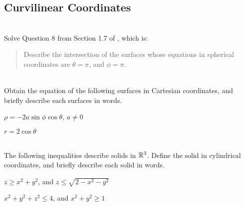 \subsection{Curvilinear Coordinates}
\BEN
\item 
{}\\
Solve Question 8 from Section 1.7 of \VCT, which is: 
\begin{quotation}
\noindent
Describe the intersection of the surfaces whose equations in spherical coordinates are $\theta = \pi$, and $\phi=\pi$.
\end{quotation}
\item 
{}\\
Obtain the equation of the following surfaces in Cartesian coordinates, and briefly describe each surfaces in words. 
\BEN
  \item  $\rho = -2a \sin\phi \cos\theta$, $a \ne 0$
  \item  $r = 2\cos\theta$
\EEN
\item 
{}\\
The following inequalities describe solids in $\mathbb{R}^3$. Define the solid in cylindrical coordinates, and briefly describe each solid in words. 
\BEN
  \item  $z \ge x^2+y^2$, and $z \le \sqrt{2-x^2-y^2}$
  \item  $x^2+y^2+z^2\le4$, and $x^2+y^2 \ge 1$
\EEN
\EEN